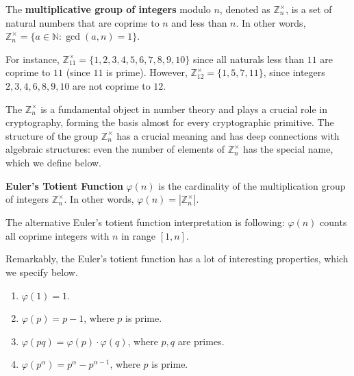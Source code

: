 \documentclass[../lecture-notes-148x210.tex]{subfiles}
\begin{document}
\begin{definition}
    The \textbf{multiplicative group of integers} modulo $n$, denoted as $\mathbb{Z}_n^{\times}$, is a set of natural numbers that are coprime to $n$ and less than $n$. In other words, $\mathbb{Z}_n^{\times} = \{a \in \mathbb{N}: \gcd(a, n) = 1\}$.
\end{definition}

\begin{example}
    For instance, $\mathbb{Z}_{11}^{\times} = \{1, 2, 3, 4, 5, 6, 7, 8, 9, 10\}$
    since all naturals less than $11$ are coprime to $11$ (since $11$ is prime).
    However, $\mathbb{Z}_{12}^{\times} = \{1, 5, 7, 11\}$, since integers $2, 3,
    4, 6, 8, 9, 10$ are not coprime to $12$. 
\end{example}

The $\mathbb{Z}_{n}^{\times}$ is a fundamental object in number theory and plays
a crucial role in cryptography, forming the basis almost for every cryptographic
primitive. The structure of the group $\mathbb{Z}_{n}^{\times}$ has a crucial
meaning and has deep connections with algebraic structures: even the number of 
elements of $\mathbb{Z}_n^{\times}$ has the special name, which we define below.

\begin{definition} \label{def:euler_totient_function}
    \textbf{Euler's Totient Function} $\varphi(n)$ is the cardinality of the multiplication 
    group of integers $\mathbb{Z}_n^{\times}$. In other words, $\varphi(n) = |\mathbb{Z}_n^{\times}|$.
\end{definition}

\begin{remark}
    The alternative Euler's totient function interpretation is following:
    $\varphi(n)$ counts all coprime integers with $n$ in range $[1, n]$. 
\end{remark}

Remarkably, the Euler's totient function has a lot of interesting properties, which we specify below.

\begin{lemma}
    \hfill
    \begin{enumerate}
        \item $\varphi(1) = 1$.
        \item $\varphi(p) = p - 1$, where $p$ is prime.
        \item $\varphi(pq) = \varphi(p) \cdot \varphi(q)$, where $p, q$ are primes.
        \item $\varphi(p^{\alpha}) = p^{\alpha} - p^{\alpha - 1}$, where $p$ is prime.        
    \end{enumerate}    
\end{lemma}
\end{document}

